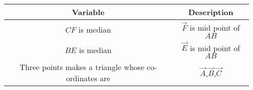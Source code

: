 \begin{tabular}[12pt]{ |c| c|}
    \hline
    \textbf{Variable} & \textbf{Description}\\ 
    \hline
    $CF$ is median & $\vec{F}$ is mid point of $AB$ \\
    \hline 
    $BE$ is median & $\vec{E}$ is mid point of $AB$ \\
    \hline
    Three points makes a triangle whose co-ordinates are & $\vec{A}$,$\vec{B}$,$\vec{C}$ \\
    \hline   
    \end{tabular}
